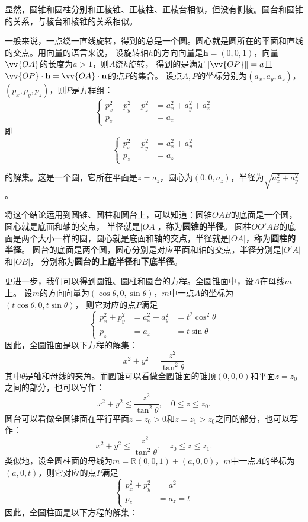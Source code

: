 \documentclass[12pt,UTF8,fontset=none]{ctexbook}
\begin{document}
显然，圆锥和圆柱分别和正棱锥、正棱柱、正棱台相似，但没有侧棱。圆台和圆锥的关系，与棱台和棱锥的关系相似。

一般来说，一点绕一直线旋转，得到的总是一个圆。圆心就是圆所在的平面和直线的交点。用向量的语言来说，
设旋转轴$h$的方向向量是$\mathbf{h} = (0,0,1)$，向量$\vv{OA}$的长度为$a>1$，则$A$绕$h$旋转，
得到的是满足$\|\vv{OP}\| = a$且$\vv{OP}\cdot\mathbf{h}=\vv{OA}\cdot\mathbf{n}$的点$P$的集合。
设点$A,P$的坐标分别为$(a_x,a_y,a_z)$，$(p_x,p_y,p_z)$，则$P$是方程组：
$$
\left\{
\begin{array}{rl}
    p_x^2+p_y^2+p_z^2 &= a_x^2+a_y^2+a_z^2 \\
    p_z &= a_z
\end{array}
\right.
$$
即
$$
\left\{
\begin{array}{rl}
    p_x^2+p_y^2 &= a_x^2+a_y^2 \\
    p_z &= a_z
\end{array}
\right.
$$

的解集。这是一个圆，它所在平面是$z=a_z$，圆心为$(0,0,a_z)$，半径为$\sqrt{a_x^2+a_y^2}$。

将这个结论运用到圆锥、圆柱和圆台上，可以知道：圆锥$OAB$的底面是一个圆，圆心就是底面和轴的交点，
半径就是$|OA|$，称为\textbf{圆锥的半径}。
圆柱$OO'AB$的底面是两个大小一样的圆，圆心就是底面和轴的交点，半径就是$|OA|$，称为\textbf{圆柱的半径}。
圆台的底面是两个圆，圆心分别是对应平面和轴的交点，半径分别是$|O'A|$和$|OB|$，
分别称为\textbf{圆台的上底半径}和\textbf{下底半径}。

更进一步，我们可以得到圆锥、圆柱和圆台的方程。全圆锥面中，设$A$在母线$m$上。
设$m$的方向向量为$(\cos{\theta}, 0, \sin{\theta})$，$m$中一点$A$的坐标为$(t\cos{\theta}, 0, t\sin{\theta})$，
则它对应的点$P$满足
$$
\left\{
\begin{array}{rll}
    p_x^2+p_y^2 &= a_x^2+a_y^2 &= t^2\cos^2{\theta} \\
    p_z &= a_z &= t\sin{\theta}
\end{array}
\right.
$$
因此，全圆锥面是以下方程的解集：
$$ x^2 + y^2 = \frac{z^2}{\tan^2{\theta}}$$
其中$\theta$是轴和母线的夹角。而圆锥可以看做全圆锥面的锥顶$( 0,0,0)$和平面$z=z_0$之间的部分，也可以写作：
$$ x^2 + y^2 \leqslant \frac{z^2}{\tan^2{\theta}} , \quad 0\leqslant z \leqslant z_0.$$
圆台可以看做全圆锥面在平行平面$z=z_0>0$和$z=z_1 > z_0$之间的部分，也可以写作：
$$ x^2 + y^2 \leqslant \frac{z^2}{\tan^2{\theta}} , \quad z_0\leqslant z \leqslant z_1.$$
类似地，设全圆柱面的母线为$m = \mathbb{R}(0,0,1)+(a,0,0)$，$m$中一点$A$的坐标为$(a, 0, t)$，则它对应的点$P$满足
$$
\left\{
\begin{array}{rl}
    p_x^2+p_y^2 &= a^2 \\
    p_z &= a_z = t
\end{array}
\right.
$$
因此，全圆柱面是以下方程的解集：
\end{document}
